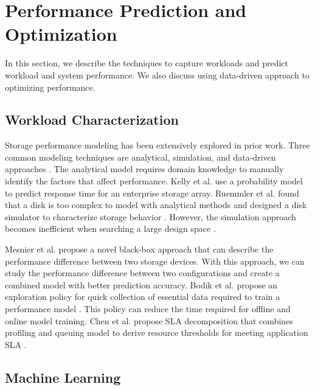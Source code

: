 \section{Performance Prediction and Optimization}

In this section, we describe the techniques to capture workloads and predict workload and system performance.
We also discuss using data-driven approach to optimizing performance.

\subsection{Workload Characterization}

Storage performance modeling has been extensively explored in prior work. 
Three common modeling techniques are analytical, simulation, and data-driven approaches \cite{Shriver1998, Kelly2004, Ardagna2014}.
The analytical model requires domain knowledge to manually identify the factors that affect performance\cite{Shriver1998, Kelly2004}.
Kelly et al. use a probability model to predict response time for an enterprise storage array.
Ruemmler et al. found that a disk is too complex to model with analytical methods and designed a disk simulator to characterize storage behavior \cite{Ruemmler1994}.
However, the simulation approach becomes inefficient when searching a large design space \cite{Kelly2004}.

Mesnier et al. \cite{Mesnier2007} propose a novel black-box approach that can describe the performance difference between two storage devices.
With this approach, we can study the performance difference between two configurations and create a combined model with better prediction accuracy.
Bodik et al. propose an exploration policy for quick collection of essential data required to train a performance model \cite{Bodik2009}.
This policy can reduce the time required for offline and online model training.
Chen et al. propose SLA decomposition that combines profiling and queuing model to derive resource thresholds for meeting application SLA \cite{Chen2007}.


\subsection{Machine Learning}


